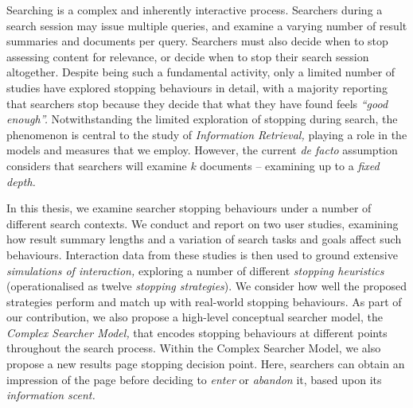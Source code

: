 
\begin{preamble}
{}

Searching is a complex and inherently interactive process. Searchers during a search session may issue multiple queries, and examine a varying number of result summaries and documents per query. Searchers must also decide when to stop assessing content for relevance, or decide when to stop their search session altogether. Despite being such a fundamental activity, only a limited number of studies have explored stopping behaviours in detail, with a majority reporting that searchers stop because they decide that what they have found feels \emph{``good enough''.} Notwithstanding the limited exploration of stopping during search, the phenomenon is central to the study of \emph{Information Retrieval,} playing a role in the models and measures that we employ. However, the current \emph{de facto} assumption considers that searchers will examine $k$ documents -- examining up to a \emph{fixed depth.}

In this thesis, we examine searcher stopping behaviours under a number of different search contexts. We conduct and report on two user studies, examining how result summary lengths and a variation of search tasks and goals affect such behaviours. Interaction data from these studies is then used to ground extensive \emph{simulations of interaction,}  exploring a number of different \emph{stopping heuristics} (operationalised as twelve \emph{stopping strategies}). We consider how well the proposed strategies perform and match up with real-world stopping behaviours. As part of our contribution, we also propose a high-level conceptual searcher model, the \emph{Complex Searcher Model,} that encodes stopping behaviours at different points throughout the search process. Within the Complex Searcher Model, we also propose a new results page stopping decision point. Here, searchers can obtain an impression of the page before deciding to \emph{enter} or \emph{abandon} it, based upon its \emph{information scent.}


\end{preamble}
